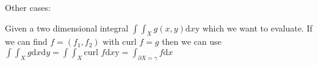 Other cases:
\begin{compactitem}
    \item Given a two dimensional integral $\int\int_X g(x, y) \mathrm{d}x\mathrm{y}$ which we want to evaluate. If we can find $f = (f_1, f_2)$ with $\text{curl }f = g$ then we can use $\int\int_X g \mathrm{d}x\mathrm{d}y = \int\int_X \text{curl }f \mathrm{d}x\mathrm{y} = \int_{\partial X = \gamma} f \mathrm{d} x$
\end{compactitem}





